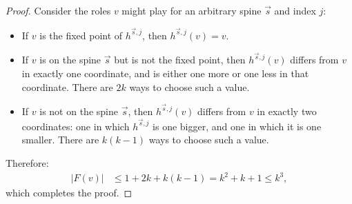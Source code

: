 \documentclass[11pt]{article}
\begin{document}
\lemmaFvsizelessthankcubed*

\begin{proof}
    Consider the roles $v$ might play for an arbitrary spine $\vec{s}$ and index $j$:
    \begin{itemize}
        \item If $v$ is the fixed point of $h^{\vec{s}, j}$, then $h^{\vec{s}, j}(v) = v$.
        \item If $v$ is on the spine $\vec{s}$ but is not the fixed point, then $h^{\vec{s}, j}(v)$ differs from $v$ in exactly one coordinate, and is either one more or one less in that coordinate. There are $2k$ ways to choose such a value.
        \item If $v$ is not on the spine $\vec{s}$, then $h^{\vec{s}, j}(v)$ differs from $v$ in exactly two coordinates: one in which $h^{\vec{s}, j}$ is one bigger, and one in which it is one smaller. There are $k(k-1)$ ways to choose such a value.
    \end{itemize}
    Therefore:
    \begin{align}
        |F(v)| &\leq 1 + 2k + k(k-1) = k^2 + k + 1 \leq k^3, \label{eq:size-F-v-less-than-k-cubed}
    \end{align}
    which completes the proof.
\end{proof}

\lemmamanyfarapartspineverticeshard*
\end{document}
